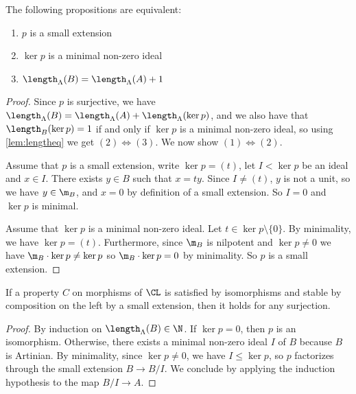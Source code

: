 \begin{lemma}
  \label{lem:smallext_iff}
  \leanok
  The following propositions are equivalent:
  \begin{enumerate}
    \item
    $p$ is a small extension
    \item
    $\ker p$ is a minimal non-zero ideal
    \item
    $\length_\Lambda (B) = \length_\Lambda (A) + 1$
  \end{enumerate}
\end{lemma}

\begin{proof}
  \leanok
  Since $p$ is surjective, we have
  $\length_\Lambda (B) = \length_\Lambda (A) + \length_\Lambda (\ker p)$,
  and we also have that $\length_B (\ker p) = 1$ if and only if
  $\ker p$ is a minimal non-zero ideal,
  so using \cref{lem:lengtheq} we get $(2) \iff (3)$.
  We now show $(1) \iff (2)$.

  Assume that $p$ is a small extension, write $\ker p = (t)$,
  let $I < \ker p$ be an ideal and $x \in I$.
  There exists $y \in B$ such that $x = ty$. Since $I \ne (t)$,
  $y$ is not a unit, so we have $y \in \m_B$, and $x = 0$
  by definition of a small extension.
  So $I=0$ and $\ker p$ is minimal.

  Assume that $\ker p$ is a minimal non-zero ideal. Let
  $t \in \ker p \setminus \{0\}$. By minimality, we have $\ker p = (t)$.
  Furthermore, since  $\m_B$ is nilpotent and $\ker p \neq 0$ we have
  $\m_B \cdot \ker p \neq \ker p$ so $\m_B \cdot \ker p = 0$ by minimality.
  So $p$ is a small extension.
\end{proof}

\begin{lemma}
  \label{lem:smallext_hom_induction}
  \leanok
  If a property $C$ on morphisms of $\CL$ is satisfied by isomorphisms
  and stable by composition on the left by a small extension, then
  it holds for any surjection.
\end{lemma}

\begin{proof}
  \leanok
  By induction on $\length_\Lambda (B) \in \N$.
  If $\ker p = 0$, then $p$ is an isomorphism.
  Otherwise, there exists a minimal non-zero ideal $I$ of $B$ because $B$ is
  Artinian. By minimality, since $\ker p \neq 0$,
  we have $I \le \ker p$, so $p$ factorizes through
  the small extension $B \to B/I$.
  We conclude by applying the induction
  hypothesis to the map $B/I \to A$.
\end{proof}

